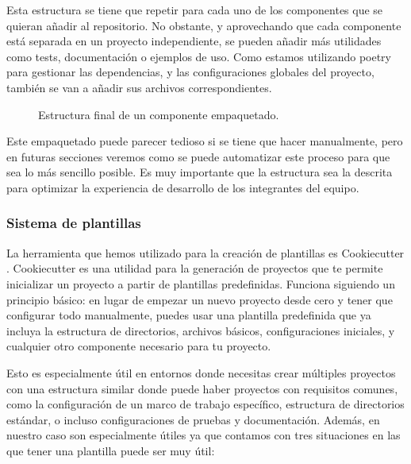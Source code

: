 Esta estructura se tiene que repetir para cada uno de los componentes que se quieran
añadir al repositorio. No obstante, y aprovechando que cada componente está separada
en un proyecto independiente, se pueden añadir más utilidades como tests, documentación
o ejemplos de uso. Como estamos utilizando poetry para gestionar las dependencias, y
las configuraciones globales del proyecto, también se van a añadir sus archivos 
correspondientes.\medskip

\begin{figure}[!h]
    \caption{Estructura final de un componente empaquetado.}
    \label{fig:real-package}
\end{figure}

Este empaquetado puede parecer tedioso si se tiene que hacer manualmente, pero en
futuras secciones veremos como se puede automatizar este proceso para que sea lo más
sencillo posible. Es muy importante que la estructura sea la descrita para optimizar
la experiencia de desarrollo de los integrantes del equipo.

\subsubsection{Sistema de plantillas}
La herramienta que hemos utilizado para la creación de plantillas es Cookiecutter \cite{Cookiecutter}.
Cookie\-cutter es una utilidad para la generación de proyectos que te permite inicializar
un proyecto a partir de plantillas predefinidas. Funciona siguiendo un principio 
básico: en lugar de empezar un nuevo proyecto desde cero y tener que configurar 
todo manualmente, puedes usar una plantilla predefinida que ya incluya la estructura 
de directorios, archivos básicos, configuraciones iniciales, y cualquier otro 
componente necesario para tu proyecto.\medskip

Esto es especialmente útil en entornos donde necesitas crear múltiples proyectos 
con una estructura similar donde puede haber proyectos con requisitos comunes, 
como la configuración de un marco de trabajo específico, estructura de directorios 
estándar, o incluso configuraciones de pruebas y documentación. Además, en nuestro
caso son especialmente útiles ya que contamos con tres situaciones en las que tener
una plantilla puede ser muy útil:

